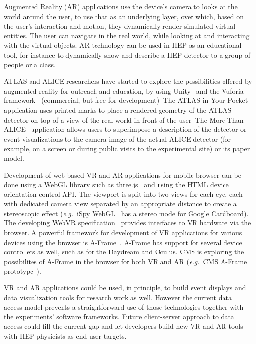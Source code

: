 \documentclass[12pt,a4paper]{article}
\begin{document}
Augmented Reality (AR) applications use the device's camera to looks at the world around the user, to use that as an underlying layer,
over which, based on the user's interaction and motion, they dynamically render simulated virtual entities. The user can navigate in the real world, while
looking at and interacting with the virtual objects. AR technology can be used in HEP as an educational tool, for instance to
dynamically show and describe a HEP detector to a group of people or a class.

ATLAS and ALICE researchers have started to explore the possibilities offered by augmented reality for outreach and education,
by using Unity~\cite{Unity3D} and the Vuforia framework~\cite{VuforiaAR} (commercial, but free for development). The ATLAS-in-Your-Pocket~\cite{AtlasPocket} application
uses printed marks to place a rendered geometry of the ATLAS detector on top of a view of the real world in front of the user.
The More-Than-ALICE~\cite{MoreThanALICE} application allows users to superimpose a description of the detector or event visualizations to the camera image of the actual
ALICE detector (for example, on a screen or during public visits to the experimental site) or its paper model.

Development of web-based VR and AR applications for mobile browser can be done using a WebGL library such as three.js~\cite{ThreeJS} and using the
HTML device orientation control API. The viewport is split into two views for each eye, each with dedicated camera view separated
by an appropriate distance to create a stereoscopic effect ({\it e.g.}\ iSpy WebGL~\cite{CMSISpyWebGL} has a stereo mode for Google Cardboard). 
The developing WebVR specification~\cite{WebVR} provides interfaces to VR hardware via the browser. A powerful framework for
development of VR applications for various devices using the browser is A-Frame~\cite{AFrame}. A-Frame has support for several device controllers as well,
such as for the Daydream and Oculus. CMS is exploring the possibilites of A-Frame in the
browser for both VR and AR ({\it e.g.}\ CMS A-Frame prototype~\cite{CMSAFrame}).

VR and AR applications could be used, in principle, to build event displays and data visualization tools for research work as well.
However the current data access model prevents a straightforward use of those technologies together with the experiments' software frameworks.
Future client-server approach to data access could fill the current gap and let developers build new VR and AR tools with HEP physicists as end-user targets.
\end{document}
